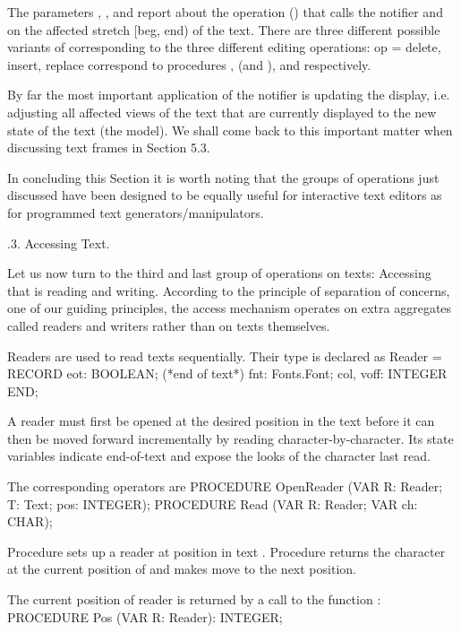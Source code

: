 \noindent The parameters , , and  report about the operation () that
calls the notifier and on the affected stretch [beg, end) of the
text. There are three different possible variants of 
corresponding to the three different editing operations: op =
delete, insert, replace correspond to procedures ,  (and
), and  respectively.

By far the most important application of the notifier is updating the
display, i.e. adjusting all affected views of the text that are
currently displayed to the new state of the text (the model). We shall
come back to this important matter when discussing text frames in
Section 5.3.

In concluding this Section it is worth noting that the groups of
operations just discussed have been designed to be equally useful for
interactive text editors as for programmed text
generators/manipulators.

.3. Accessing Text.

Let us now turn to the third and last group of operations on texts:
Accessing that is reading and writing. According to the principle of
separation of concerns, one of our guiding principles, the access
mechanism operates on extra aggregates called readers and writers
rather than on texts themselves.

Readers are used to read texts sequentially. Their type is declared as
\begintt
Reader = RECORD
  eot: BOOLEAN; (*end of text*)
  fnt: Fonts.Font;
  col, voff: INTEGER
END;
\endtt

\noindent A reader must first be opened at the desired position in the text
before it can then be moved forward incrementally by reading
character-by-character. Its state variables indicate end-of-text and
expose the looks of the character last read.

The corresponding operators are
\begintt
PROCEDURE OpenReader (VAR R: Reader; T: Text; pos: INTEGER);
PROCEDURE Read (VAR R: Reader; VAR ch: CHAR);
\endtt

\noindent Procedure  sets up a reader  at position  in text
. Procedure  returns the character at the current position of 
and makes  move to the next position.

\noindent The current position of reader  is returned by a call to the function :
\begintt
PROCEDURE Pos (VAR R: Reader): INTEGER;
\endtt


